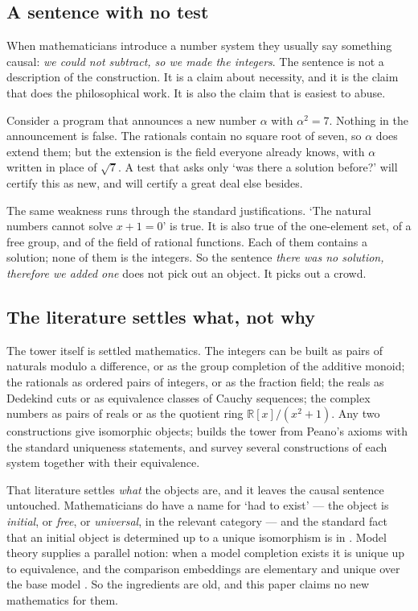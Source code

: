 \documentclass[12pt,a4paper]{article}
\begin{document}
\subsection{A sentence with no test}

When mathematicians introduce a number system they usually say something causal:
\emph{we could not subtract, so we made the integers}.  The sentence is not a
description of the construction.  It is a claim about necessity, and it is the
claim that does the philosophical work.  It is also the claim that is easiest to
abuse.

Consider a program that announces a new number $\alpha$ with $\alpha^{2}=7$.
Nothing in the announcement is false.  The rationals contain no square root of
seven, so $\alpha$ does extend them; but the extension is the field everyone
already knows, with $\alpha$ written in place of $\sqrt{7}$.  A test that asks only
`was there a solution before?' will certify this as new, and will certify a great
deal else besides.

The same weakness runs through the standard justifications.  `The natural numbers
cannot solve $x+1=0$' is true.  It is also true of the one-element set, of a free
group, and of the field of rational functions.  Each of them contains a solution;
none of them is the integers.  So the sentence \emph{there was no solution,
therefore we added one} does not pick out an object.  It picks out a crowd.

\subsection{The literature settles what, not why}

The tower itself is settled mathematics.  The integers can be built as pairs of
naturals modulo a difference, or as the group completion of the additive monoid;
the rationals as ordered pairs of integers, or as the fraction field; the reals as
Dedekind cuts \citep{dedekind} or as equivalence classes of Cauchy sequences; the
complex numbers as pairs of reals \citep[following Hamilton, 1837]{ebb} or as the
quotient ring $\mathbb{R}[x]/(x^{2}+1)$.  Any two constructions give isomorphic
objects; \citet{landau} builds the tower from Peano's axioms with the standard
uniqueness statements, and \citet{ebb} survey several constructions of each system
together with their equivalence.

That literature settles \emph{what} the objects are, and it leaves the causal
sentence untouched.  Mathematicians do have a name for `had to exist' --- the
object is \emph{initial}, or \emph{free}, or \emph{universal}, in the relevant
category --- and the standard fact that an initial object is determined up to a
unique isomorphism is in \citet{MacLane1971}.  Model theory supplies a parallel
notion: when a model completion exists it is unique up to equivalence, and the
comparison embeddings are elementary and unique over the base model
\citep{EklofSabbagh1971,Hodges1993}.  So the ingredients are old, and this paper claims no new
mathematics for them.
\end{document}
